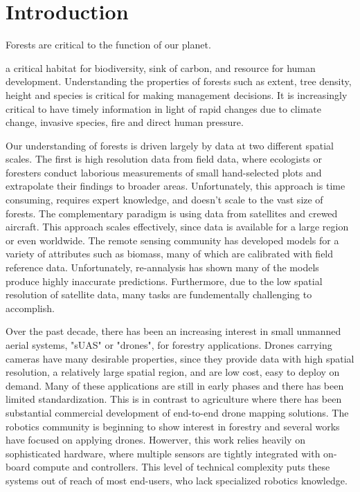 
\chapter{Introduction} \label{secIntro}
Forests are critical to the function of our planet. 

a critical habitat for biodiversity, sink of carbon, and resource for human development. Understanding the properties of forests such as extent, tree density, height and species is critical for making management decisions. It is increasingly critical to have timely information in light of rapid changes due to climate change, invasive species, fire and direct human pressure.   

Our understanding of forests is driven largely by data at two different spatial scales. The first is high resolution data from  field data, where ecologists or foresters conduct laborious measurements of small hand-selected plots and extrapolate their findings to broader areas. Unfortunately, this approach is time consuming, requires expert knowledge, and doesn't scale to the vast size of forests. The complementary paradigm is using data from satellites and crewed aircraft. This approach scales effectively, since data is available for a large region or even worldwide. The remote sensing community has developed models for a variety of attributes such as biomass, many of which are calibrated with field reference data. Unfortunately, re-annalysis has shown many of the models produce highly inaccurate predictions. Furthermore, due to the low spatial resolution of satellite data, many tasks are fundementally challenging to accomplish.

Over the past decade, there has been an increasing interest in small unmanned aerial systems, "sUAS" or "drones", for forestry applications. Drones carrying cameras have many desirable properties,
 since they provide data with high spatial resolution, a relatively large spatial region, and are low cost, easy to deploy on demand. 
 Many of these applications are still in early phases and there has been limited standardization. This is in contrast to agriculture where there has been substantial commercial development of end-to-end drone mapping solutions. The robotics community is beginning to show interest in forestry and several works have focused on applying drones. Howerver, this work relies heavily on sophisticated hardware, where multiple sensors are tightly integrated with on-board compute and controllers. This level of technical complexity puts these systems out of reach of most end-users, who lack specialized robotics knowledge.

